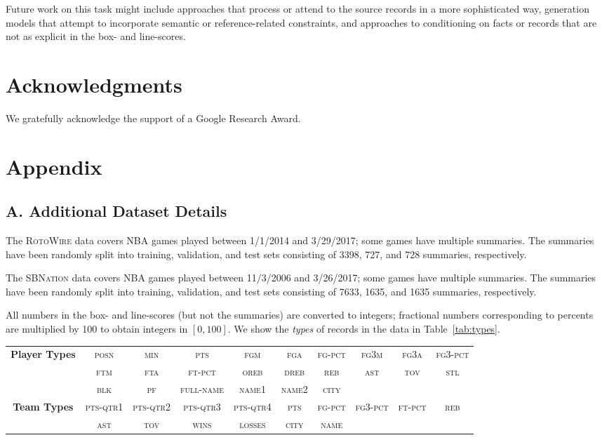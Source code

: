 \documentclass[11pt,letterpaper]{article}
\begin{document}
Future work on this task might include approaches that process or attend to the source records in a more sophisticated way, generation models that attempt to incorporate semantic or reference-related constraints, and approaches to conditioning on facts or records that are not as explicit in the box- and line-scores.



\section*{Acknowledgments}
We gratefully acknowledge the support of a Google Research Award.




\newpage
\section*{Appendix}
\subsection*{A. Additional Dataset Details}
The \textsc{RotoWire} data covers NBA games played between 1/1/2014 and 3/29/2017; some games have multiple summaries. The summaries have been randomly split into training, validation, and test sets consisting of 3398, 727, and 728 summaries, respectively.

The \textsc{SBNation} data covers NBA games played between 11/3/2006 and 3/26/2017; some games have multiple summaries. The summaries have been randomly split into training, validation, and test sets consisting of 7633, 1635, and 1635 summaries, respectively.

All numbers in the box- and line-scores (but not the summaries) are converted to integers; fractional numbers corresponding to percents are multiplied by 100 to obtain integers in $[0, 100]$. We show the \textit{types} of records in the data in Table~\ref{tab:types}.

\begin{table*}
\centering
\small
\begin{tabular}{cccccccccc}
\toprule
\textbf{Player Types} & \textsc{posn} & \textsc{min} & \textsc{pts} & \textsc{fgm} & \textsc{fga} & \textsc{fg-pct} & \textsc{fg3m} & \textsc{fg3a} & \textsc{fg3-pct}  \\
& \textsc{ftm} & \textsc{fta} & \textsc{ft-pct} & \textsc{oreb} & \textsc{dreb} & \textsc{reb} & \textsc{ast} & \textsc{tov} & \textsc{stl}  \\
& \textsc{blk} & \textsc{pf} & \textsc{full-name} & \textsc{name1} & \textsc{name2} & \textsc{city} & & & \\[2mm] 
\textbf{Team Types} & \textsc{pts-qtr1} & \textsc{pts-qtr2} & \textsc{pts-qtr3} & \textsc{pts-qtr4} & \textsc{pts} & \textsc{fg-pct} & \textsc{fg3-pct} & \textsc{ft-pct} & \textsc{reb} \\
& \textsc{ast} & \textsc{tov} & \textsc{wins} & \textsc{losses} & \textsc{city} & \textsc{name} & & & \\
\bottomrule
\end{tabular}
\caption{Possible Record Types}
\label{tab:types}
\end{table*}
\end{document}
